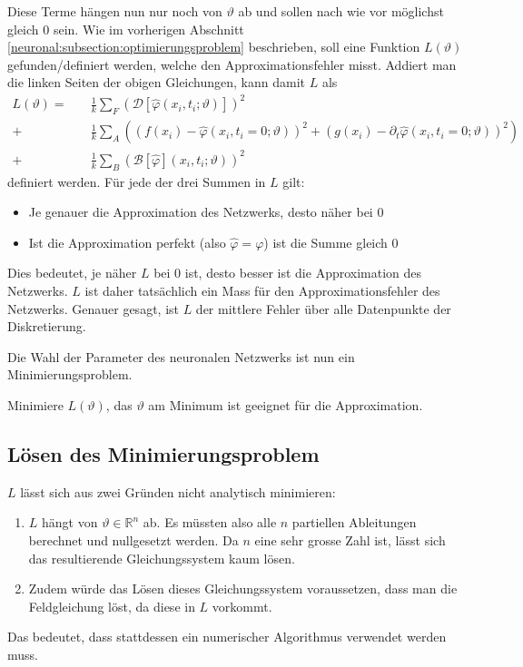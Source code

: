 Diese Terme hängen nun nur noch von $\vartheta$ ab und sollen nach wie vor möglichst gleich 0 sein.
Wie im vorherigen Abschnitt \ref{neuronal:subsection:optimierungsproblem} beschrieben, soll eine Funktion $L(\vartheta)$ gefunden/definiert werden, welche den Approximationsfehler misst.
Addiert man die linken Seiten der obigen Gleichungen, kann damit \( L \) als
\begin{equation}
    \begin{aligned}
        L(\vartheta) =\quad &\frac{1}{k} \sum_{F}^{} \left(\mathcal{D}[\hat{\varphi}(x_i, t_i; \vartheta)]\right)^2\\
        + &\frac{1}{k} \sum_{A}^{} \left(\left(f(x_i) - \hat{\varphi}(x_i, t_i = 0; \vartheta)\right)^2
        + \left(g(x_i) - \partial_t \hat{\varphi}(x_i, t_i = 0; \vartheta)\right)^2\right)\\
        + &\frac{1}{k} \sum_{B}^{} \left(\mathcal{B}[\hat{\varphi}](x_i, t_i; \vartheta)\right)^2
    \end{aligned}
    \label{neuronal:optimierung}
\end{equation}
definiert werden.
Für jede der drei Summen in \( L \) gilt:
\begin{itemize}
    \item Je genauer die Approximation des Netzwerks, desto näher bei 0
    \item Ist die Approximation perfekt (also \( \hat{\varphi} = \varphi \)) ist die Summe gleich 0
\end{itemize}
Dies bedeutet, je näher \( L \) bei 0 ist, desto besser ist die Approximation des Netzwerks.
$L$ ist daher tatsächlich ein Mass für den Approximationsfehler des Netzwerks.
Genauer gesagt, ist $L$ der mittlere Fehler über alle Datenpunkte der Diskretierung.

Die Wahl der Parameter des neuronalen Netzwerks ist nun ein Minimierungsproblem.
\begin{aufgabe}
    Minimiere $L(\vartheta)$, das $\vartheta$ am Minimum ist geeignet für die Approximation.
\end{aufgabe}

\subsection{Lösen des Minimierungsproblem}\label{neuronal:subsection:lösen_optimierungsproblem}
\( L \) lässt sich aus zwei Gründen nicht analytisch minimieren:
\begin{enumerate}
    \item \( L \) hängt von \( \vartheta \in \mathbb{R}^n \) ab. 
    Es müssten also alle \( n \) partiellen Ableitungen berechnet und nullgesetzt werden. 
    Da \( n \) eine sehr grosse Zahl ist, lässt sich das resultierende Gleichungssystem kaum lösen.
    \item Zudem würde das Lösen dieses Gleichungssystem voraussetzen, dass man die Feldgleichung löst, da diese in $L$ vorkommt.
\end{enumerate}
Das bedeutet, dass stattdessen ein numerischer Algorithmus verwendet werden muss.

